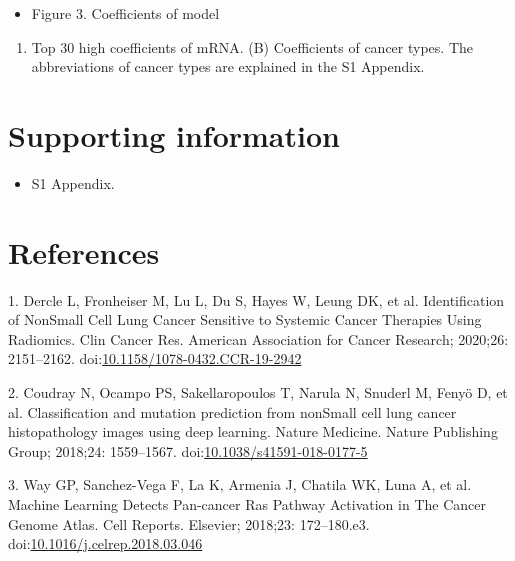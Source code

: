 \documentclass[10pt,letterpaper]{article}
\providecommand{\tightlist}{%
  \setlength{\itemsep}{0pt}\setlength{\parskip}{0pt}}
\begin{document}
\begin{itemize}
\tightlist
\item
  Figure 3. Coefficients of model
\end{itemize}

\begin{enumerate}
\def\labelenumi{(\Alph{enumi})}
\tightlist
\item
  Top 30 high coefficients of mRNA. (B) Coefficients of cancer types.
  The abbreviations of cancer types are explained in the S1 Appendix.
\end{enumerate}

\hypertarget{supporting-information}{%
\section{Supporting information}\label{supporting-information}}

\begin{itemize}
\tightlist
\item
  S1 Appendix.
\end{itemize}

\hypertarget{references}{%
\section*{References}\label{references}}

\hypertarget{refs}{}
\leavevmode\hypertarget{ref-dercleIdentificationNonSmall2020}{}%
1. Dercle L, Fronheiser M, Lu L, Du S, Hayes W, Leung DK, et al.
Identification of NonSmall Cell Lung Cancer Sensitive to Systemic Cancer
Therapies Using Radiomics. Clin Cancer Res. American Association for
Cancer Research; 2020;26: 2151--2162.
doi:\href{https://doi.org/10.1158/1078-0432.CCR-19-2942}{10.1158/1078-0432.CCR-19-2942}

\leavevmode\hypertarget{ref-coudrayClassificationMutationPrediction2018}{}%
2. Coudray N, Ocampo PS, Sakellaropoulos T, Narula N, Snuderl M, Fenyö
D, et al. Classification and mutation prediction from nonSmall cell lung
cancer histopathology images using deep learning. Nature Medicine.
Nature Publishing Group; 2018;24: 1559--1567.
doi:\href{https://doi.org/10.1038/s41591-018-0177-5}{10.1038/s41591-018-0177-5}

\leavevmode\hypertarget{ref-wayMachineLearningDetects2018}{}%
3. Way GP, Sanchez-Vega F, La K, Armenia J, Chatila WK, Luna A, et al.
Machine Learning Detects Pan-cancer Ras Pathway Activation in The Cancer
Genome Atlas. Cell Reports. Elsevier; 2018;23: 172--180.e3.
doi:\href{https://doi.org/10.1016/j.celrep.2018.03.046}{10.1016/j.celrep.2018.03.046}
\end{document}
